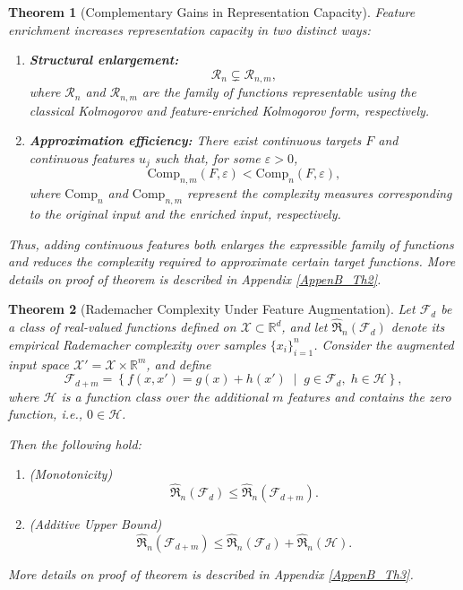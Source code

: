 \documentclass{article}
\newtheorem{theorem}{Theorem}
\begin{document}
\begin{theorem}[Complementary Gains in Representation Capacity]
Feature enrichment increases representation capacity in two distinct ways:

\begin{enumerate}
    \item \textbf{Structural enlargement:}
    \[
    \mathcal{R}_{n} \subsetneq \mathcal{R}_{n,m},
    \]
    where $\mathcal{R}_{n}$ and $\mathcal{R}_{n,m}$ are the family of functions representable using the classical Kolmogorov and feature-enriched Kolmogorov form, respectively.
    \item \textbf{Approximation efficiency:}
    There exist continuous targets \(F\) and continuous features \(u_j\)
    such that, for some \(\varepsilon>0\),
    \[
    \mathrm{Comp}_{n,m}(F,\varepsilon)
    <
    \mathrm{Comp}_{n}(F,\varepsilon),
    \]
   where $\mathrm{Comp}_{n}$ and $\mathrm{Comp}_{n,m}$ represent the complexity measures corresponding to the original input and the enriched input, respectively.
\end{enumerate}
\noindent
Thus, adding continuous features both enlarges the expressible family
of functions and reduces the complexity required to approximate
certain target functions. 
More details on proof of theorem is described in Appendix \ref{AppenB_Th2}.
\end{theorem}



\begin{theorem}
[Rademacher Complexity Under Feature Augmentation] Let $\mathcal{F}_d$ be a class of real-valued functions defined on 
$\mathcal{X} \subset \mathbb{R}^d$, and let $\hat{\mathfrak{R}}_n(\mathcal{F}_d)$ 
denote its empirical Rademacher complexity over samples 
$\{x_i\}_{i=1}^n$. Consider the augmented input space 
$\mathcal{X}' = \mathcal{X} \times \mathbb{R}^m$, and define
\[
\mathcal{F}_{d+m}
=
\left\{
f(x,x') = g(x) + h(x') 
\;\middle|\;
g \in \mathcal{F}_d,\;
h \in \mathcal{H}
\right\},
\]
where $\mathcal{H}$ is a function class over the additional $m$ features 
and contains the zero function, i.e., $0 \in \mathcal{H}$.

Then the following hold:

\begin{enumerate}
    \item (Monotonicity)
    \[
    \hat{\mathfrak{R}}_n(\mathcal{F}_d)
    \le
    \hat{\mathfrak{R}}_n(\mathcal{F}_{d+m}).
    \]

    \item (Additive Upper Bound)
    \[
    \hat{\mathfrak{R}}_n(\mathcal{F}_{d+m})
    \le
    \hat{\mathfrak{R}}_n(\mathcal{F}_d)
    +
    \hat{\mathfrak{R}}_n(\mathcal{H}).
    \]
\end{enumerate}
More details on proof of theorem is described in Appendix \ref{AppenB_Th3}.
\end{theorem}
\end{document}
